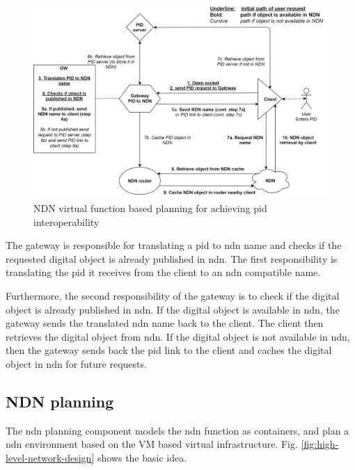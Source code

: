 \documentclass[conference]{IEEEtran}
\begin{document}

\begin{figure}[H]
\centering
\includegraphics[width=\columnwidth]{images/PIDtoNDN.png}
\caption{NDN virtual function based planning for achieving \gls{pid} interoperability}
\label{fig:sdc_model}
\end{figure}


The gateway is responsible for translating a \gls{pid} to \gls{ndn} name and checks if the requested digital object is already published in \gls{ndn}. The first responsibility is translating the \gls{pid} it receives from the client to an \gls{ndn} compatible name. 

Furthermore, the second responsibility of the gateway is to check if the digital object is already published in \gls{ndn}. If the digital object is available in \gls{ndn}, the gateway sends the translated \gls{ndn} name back to the client. The client then retrieves the digital object from \gls{ndn}. If the digital object is not available in \gls{ndn}, then the gateway sends back the \gls{pid} link to the client and caches the digital object in \gls{ndn} for future requests.



\subsection{NDN planning}
The \gls{ndn} planning component models the \gls{ndn} function as containers, and plan a \gls{ndn} environment based on the VM based virtual infrastructure. Fig. \ref{fig:high-level-network-design} shows the basic idea. 
\end{document}
